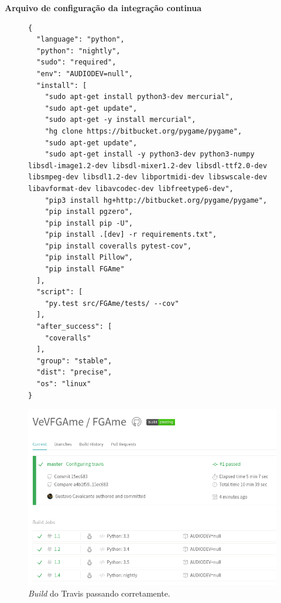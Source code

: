 \pagestyle{empty}


{\LARGE \textbf{Arquivo de configuração da integração continua}}

\begin{anexosenv}
\begin{figure}[!htb]
\begin{lstlisting}
{
  "language": "python",
  "python": "nightly",
  "sudo": "required",
  "env": "AUDIODEV=null",
  "install": [
    "sudo apt-get install python3-dev mercurial",
    "sudo apt-get update",
    "sudo apt-get -y install mercurial",
    "hg clone https://bitbucket.org/pygame/pygame",
    "sudo apt-get update",
    "sudo apt-get install -y python3-dev python3-numpy libsdl-image1.2-dev libsdl-mixer1.2-dev libsdl-ttf2.0-dev libsmpeg-dev libsdl1.2-dev libportmidi-dev libswscale-dev libavformat-dev libavcodec-dev libfreetype6-dev",
    "pip3 install hg+http://bitbucket.org/pygame/pygame",
    "pip install pgzero",
    "pip install pip -U",
    "pip install .[dev] -r requirements.txt",
    "pip install coveralls pytest-cov",
    "pip install Pillow",
    "pip install FGAme"
  ],
  "script": [
    "py.test src/FGAme/tests/ --cov"
  ],
  "after_success": [
    "coveralls"
  ],
  "group": "stable",
  "dist": "precise",
  "os": "linux"
}
\end{lstlisting}
\end{figure}

\begin{figure}[!htb]
\centering
\includegraphics[scale=0.6]{figuras/build}
\caption{\textit{Build} do Travis passando corretamente.}
\label{Rotulo}
\end{figure}

\end{anexosenv}